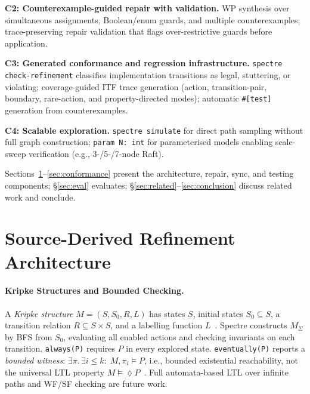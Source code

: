 \documentclass[runningheads]{llncs}
\begin{document}
\smallskip\noindent\textbf{C2: Counterexample-guided repair with validation.}
WP synthesis over simultaneous assignments, Boolean/enum guards, and
multiple counterexamples; trace-preserving repair validation that flags
over-restrictive guards before application.

\smallskip\noindent\textbf{C3: Generated conformance and regression infrastructure.}
\texttt{spectre check-refinement} classifies implementation transitions as
legal, stuttering, or violating; coverage-guided ITF trace generation
(action, transition-pair, boundary, rare-action, and property-directed modes);
automatic \texttt{\#[test]} generation from counterexamples.

\smallskip\noindent\textbf{C4: Scalable exploration.}
\texttt{spectre simulate} for direct path sampling without full graph construction;
\texttt{param N: int} for parameterised models enabling scale-sweep
verification (e.g., 3-/5-/7-node Raft).

Sections~\ref{sec:arch}--\ref{sec:conformance} present the architecture,
repair, sync, and testing components; \S\ref{sec:eval} evaluates;
\S\ref{sec:related}--\ref{sec:conclusion} discuss related work and conclude.

\section{Source-Derived Refinement Architecture}\label{sec:arch}

\paragraph{Kripke Structures and Bounded Checking.}
A \emph{Kripke structure} $M = (S, S_0, R, L)$ has states $S$, initial states
$S_0 \subseteq S$, a transition relation $R \subseteq S \times S$, and a
labelling function $L$~\cite{clarke1986automatic}.
Spectre constructs $M_\Sigma$ by BFS from $S_0$, evaluating all enabled
actions and checking invariants on each transition.
\texttt{always(P)} requires $P$ in every explored state.
\texttt{eventually(P)} reports a \emph{bounded witness}:
$\exists\pi.\,\exists i \le k{:}\;M,\pi_i \models P$, i.e., bounded
existential reachability, not the universal LTL property $M \models \lozenge P$~\cite{pnueli1977temporal}.
Full automata-based LTL over infinite paths and WF/SF checking are future work.
\end{document}
